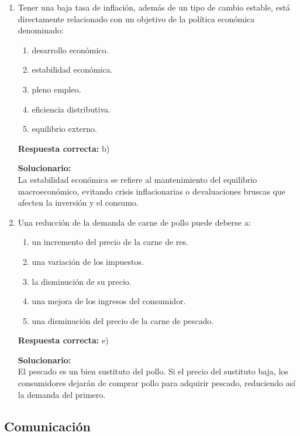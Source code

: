 \begin{enumerate}
	\vspace{6mm}
	
	\item Tener una baja tasa de inflación, además de un tipo de cambio estable, está directamente relacionado con un objetivo de la política económica denominado:
	\begin{enumerate}[label=\alph*)]
		\item desarrollo económico.
		\item estabilidad económica.
		\item pleno empleo.
		\item eficiencia distributiva.
		\item equilibrio externo.
	\end{enumerate}
	\textbf{Respuesta correcta:} b)
	
	\vspace{2mm}
	\textbf{Solucionario:}\\
	La estabilidad económica se refiere al mantenimiento del equilibrio macroeconómico, evitando crisis inflacionarias o devaluaciones bruscas que afecten la inversión y el consumo.
	
	\vspace{6mm}
	
	\item Una reducción de la demanda de carne de pollo puede deberse a:
	\begin{enumerate}[label=\alph*)]
		\item un incremento del precio de la carne de res.
		\item una variación de los impuestos.
		\item la disminución de su precio.
		\item una mejora de los ingresos del consumidor.
		\item una disminución del precio de la carne de pescado.
	\end{enumerate}
	\textbf{Respuesta correcta:} e)
	
	\vspace{2mm}
	\textbf{Solucionario:}\\
	El pescado es un bien sustituto del pollo. Si el precio del sustituto baja, los consumidores dejarán de comprar pollo para adquirir pescado, reduciendo así la demanda del primero.
	
	\vspace{6mm}
\end{enumerate}


\subsection*{Comunicación}

